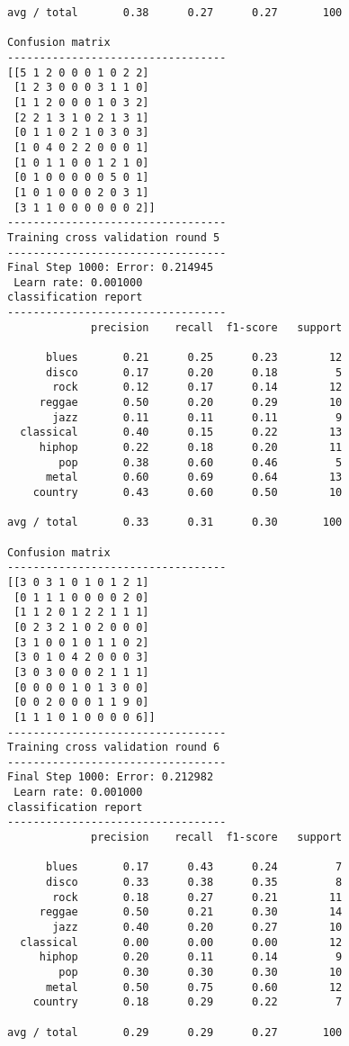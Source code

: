 \documentclass{article}
\begin{document}
\begin{Verbatim}[commandchars=\\\{\}]
avg / total       0.38      0.27      0.27       100

Confusion matrix
----------------------------------
[[5 1 2 0 0 0 1 0 2 2]
 [1 2 3 0 0 0 3 1 1 0]
 [1 1 2 0 0 0 1 0 3 2]
 [2 2 1 3 1 0 2 1 3 1]
 [0 1 1 0 2 1 0 3 0 3]
 [1 0 4 0 2 2 0 0 0 1]
 [1 0 1 1 0 0 1 2 1 0]
 [0 1 0 0 0 0 0 5 0 1]
 [1 0 1 0 0 0 2 0 3 1]
 [3 1 1 0 0 0 0 0 0 2]]
----------------------------------
Training cross validation round 5
----------------------------------
Final Step 1000: Error: 0.214945 
 Learn rate: 0.001000
classification report 
----------------------------------
             precision    recall  f1-score   support

      blues       0.21      0.25      0.23        12
      disco       0.17      0.20      0.18         5
       rock       0.12      0.17      0.14        12
     reggae       0.50      0.20      0.29        10
       jazz       0.11      0.11      0.11         9
  classical       0.40      0.15      0.22        13
     hiphop       0.22      0.18      0.20        11
        pop       0.38      0.60      0.46         5
      metal       0.60      0.69      0.64        13
    country       0.43      0.60      0.50        10

avg / total       0.33      0.31      0.30       100

Confusion matrix
----------------------------------
[[3 0 3 1 0 1 0 1 2 1]
 [0 1 1 1 0 0 0 0 2 0]
 [1 1 2 0 1 2 2 1 1 1]
 [0 2 3 2 1 0 2 0 0 0]
 [3 1 0 0 1 0 1 1 0 2]
 [3 0 1 0 4 2 0 0 0 3]
 [3 0 3 0 0 0 2 1 1 1]
 [0 0 0 0 1 0 1 3 0 0]
 [0 0 2 0 0 0 1 1 9 0]
 [1 1 1 0 1 0 0 0 0 6]]
----------------------------------
Training cross validation round 6
----------------------------------
Final Step 1000: Error: 0.212982 
 Learn rate: 0.001000
classification report 
----------------------------------
             precision    recall  f1-score   support

      blues       0.17      0.43      0.24         7
      disco       0.33      0.38      0.35         8
       rock       0.18      0.27      0.21        11
     reggae       0.50      0.21      0.30        14
       jazz       0.40      0.20      0.27        10
  classical       0.00      0.00      0.00        12
     hiphop       0.20      0.11      0.14         9
        pop       0.30      0.30      0.30        10
      metal       0.50      0.75      0.60        12
    country       0.18      0.29      0.22         7

avg / total       0.29      0.29      0.27       100


\end{Verbatim}
\end{document}
